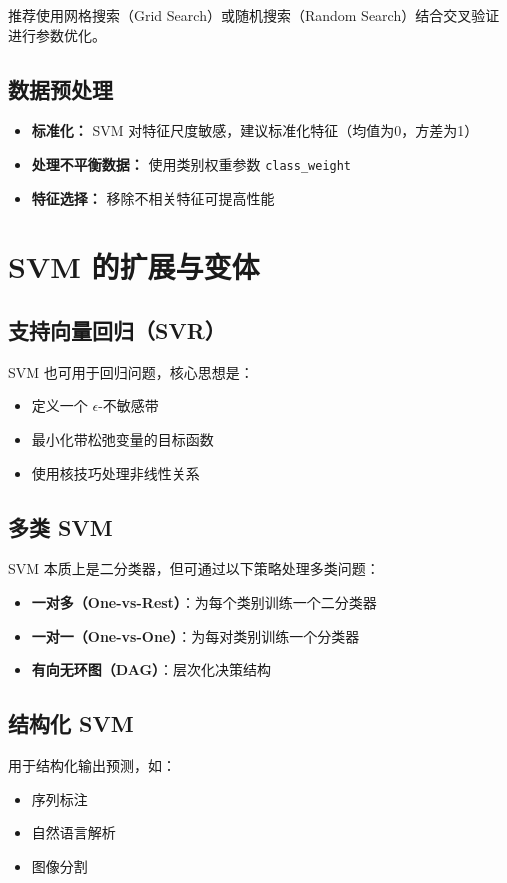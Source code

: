 \documentclass{article}
\begin{document}
推荐使用网格搜索（Grid Search）或随机搜索（Random Search）结合交叉验证进行参数优化。

\subsection*{数据预处理}
\begin{itemize}
    \item \textbf{标准化：} SVM 对特征尺度敏感，建议标准化特征（均值为0，方差为1）
    \item \textbf{处理不平衡数据：} 使用类别权重参数 \texttt{class\_weight}
    \item \textbf{特征选择：} 移除不相关特征可提高性能
\end{itemize}

\section*{SVM 的扩展与变体}
\subsection*{支持向量回归（SVR）}
SVM 也可用于回归问题，核心思想是：
\begin{itemize}
    \item 定义一个 $\epsilon$-不敏感带
    \item 最小化带松弛变量的目标函数
    \item 使用核技巧处理非线性关系
\end{itemize}

\subsection*{多类 SVM}
SVM 本质上是二分类器，但可通过以下策略处理多类问题：
\begin{itemize}
    \item \textbf{一对多（One-vs-Rest）}：为每个类别训练一个二分类器
    \item \textbf{一对一（One-vs-One）}：为每对类别训练一个分类器
    \item \textbf{有向无环图（DAG）}：层次化决策结构
\end{itemize}

\subsection*{结构化 SVM}
用于结构化输出预测，如：
\begin{itemize}
    \item 序列标注
    \item 自然语言解析
    \item 图像分割
\end{itemize}
\end{document}
